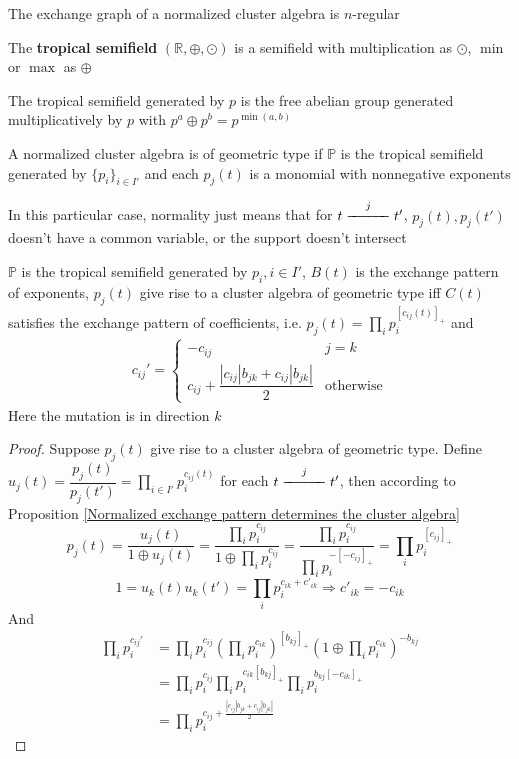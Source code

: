 \documentclass[main]{subfiles}
\begin{document}
\begin{corollary}
The exchange graph of a normalized cluster algebra is $n$-regular
\end{corollary}

\begin{definition}
The \textbf{tropical semifield} $(\mathbb R,\oplus,\odot)$ is a semifield with multiplication as $\odot$, $\min$ or $\max$ as $\oplus$ \par
The tropical semifield generated by $p$ is the free abelian group generated multiplicatively by $p$ with $p^a\oplus p^b=p^{\min(a,b)}$
\end{definition}

\begin{definition}
A normalized cluster algebra is of geometric type if $\mathbb P$ is the tropical semifield generated by $\{p_i\}_{i\in I'}$ and each $p_j(t)$ is a monomial with nonnegative exponents
\end{definition}

\begin{remark}
In this particular case, normality just means that for $t\xedge jt'$, $p_j(t),p_j(t')$ doesn't have a common variable, or the support doesn't intersect
\end{remark}

\begin{proposition}
$\mathbb P$ is the tropical semifield generated by $p_i,i\in I'$, $B(t)$ is the exchange pattern of exponents, $p_j(t)$ give rise to a cluster algebra of geometric type iff $C(t)$ satisfies the exchange pattern of coefficients, i.e. $\displaystyle p_{j}(t)=\prod_ip_i^{[c_{ij}(t)]_+}$ and
\begin{align*}
c_{ij}'=\begin{cases}
-c_{ij}&j=k \\
c_{ij}+\dfrac{|c_{ij}|b_{jk}+c_{ij}|b_{jk}|}{2}&\text{otherwise}
\end{cases}
\end{align*}
Here the mutation is in direction $k$
\end{proposition}

\begin{proof}
Suppose $p_j(t)$ give rise to a cluster algebra of geometric type. Define $\displaystyle u_j(t)=\dfrac{p_j(t)}{p_j(t')}=\prod_{i\in I'}p_i^{c_{ij}(t)}$ for each $t\xedge jt'$, then according to Proposition \ref{Normalized exchange pattern determines the cluster algebra}
\[p_j(t)=\dfrac{u_j(t)}{1\oplus u_j(t)}=\dfrac{\prod_ip_i^{c_{ij}}}{1\oplus\prod_ip_i^{c_{ij}}}=\dfrac{\prod_ip_i^{c_{ij}}}{\prod_ip_i^{-[-c_{ij}]_+}}=\prod_ip_i^{[c_{ij}]_+}\]
\[1=u_k(t)u_k(t')=\prod_ip_i^{c_{ik}+c'_{ik}}\Rightarrow c'_{ik}=-c_{ik}\]
And
\begin{align*}
\prod_ip_i^{c_{ij}'}&=\prod_ip_i^{c_{ij}}\left(\prod_ip_i^{c_{ik}}\right)^{[b_{kj}]_+}\left(1\oplus\prod_ip_i^{c_{ik}}\right)^{-b_{kj}} \\
&=\prod_ip_i^{c_{ij}}\prod_ip_i^{c_{ik}[b_{kj}]_+}\prod_ip_i^{b_{kj}[-c_{ik}]_+} \\
&=\prod_ip_i^{c_{ij}+\frac{|c_{ij}|b_{jk}+c_{ij}|b_{jk}|}{2}}
\end{align*}
\end{proof}
\end{document}
